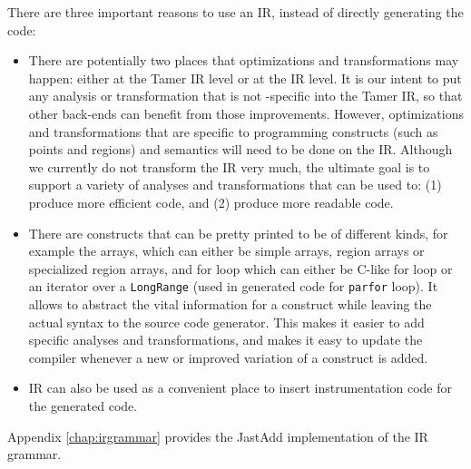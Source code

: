 There are three important reasons to use an IR, instead of directly generating the
\xten code: \begin{itemize} 

\item There are potentially two places that
optimizations and transformations may happen:  either at the Tamer IR level or
at the \mixten IR level.  It is our intent to put any analysis or transformation
that is not \xten-specific into the Tamer IR, so that other back-ends can
benefit from those improvements.   However, optimizations and  transformations
that are specific to \xten programming constructs (such as points and regions)
and semantics will need to be done on the \mixten IR. Although we currently do
not transform the \mixten IR very much, the ultimate goal is to support a
variety of analyses and transformations that can be used to: (1) produce more
efficient \xten code, and (2) produce more readable \xten code.  

\item There are \xten constructs that can be pretty
printed to be of different kinds, for example the \xten arrays, which can either
be simple arrays, region arrays or specialized region arrays, and \xten for loop
which can either be C-like for loop or an iterator over a \texttt{LongRange}
(used in generated code for \texttt{parfor} loop). It allows to abstract the
vital information for a construct while leaving the actual syntax to the source
code generator. This makes it easier to add \xten specific analyses and
transformations, and makes it easy to update the compiler whenever a new or
improved variation of a construct is added. 

\item \mixten IR can also be used as a convenient place to insert
instrumentation code for the generated \xten code.

\end{itemize}   

Appendix \ref{chap:irgrammar} provides the JastAdd implementation of the \mixten IR
grammar.

%

